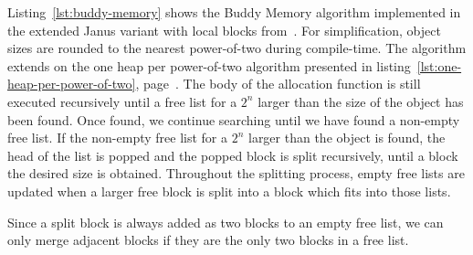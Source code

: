 Listing~\ref{lst:buddy-memory} shows the Buddy Memory algorithm implemented in the extended Janus variant with local blocks from~\cite{ty:ejanus}. For simplification, object sizes are rounded to the nearest power-of-two during compile-time. The algorithm extends on the one heap per power-of-two algorithm presented in listing~\ref{lst:one-heap-per-power-of-two}, page~\pageref{lst:one-heap-per-power-of-two}.
The body of the allocation function is still executed recursively until a free list for a $2^n$ larger than the size of the object has been found. Once found, we continue searching until we have found a non-empty free list. If the non-empty free list for a $2^n$ larger than the object is found, the head of the list is popped and the popped block is split recursively, until a block the desired size is obtained. Throughout the splitting process, empty free lists are updated when a larger free block is split into a block which fits into those lists.

Since a split block is always added as two blocks to an empty free list, we can only merge adjacent blocks if they are the only two blocks in a free list.
